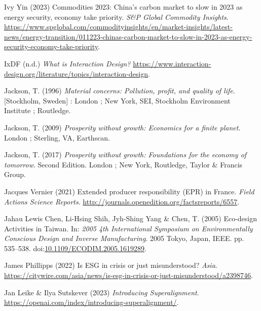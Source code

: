 \documentclass[
  letterpaper,
  DIV=11,
  numbers=noendperiod]{scrartcl}
\newlength{\cslhangindent}
\newenvironment{CSLReferences}[2] %
 {\begin{list}{}{%
  \setlength{\itemindent}{0pt}
  \setlength{\leftmargin}{0pt}
  \setlength{\parsep}{0pt}
  \ifodd #1
   \setlength{\leftmargin}{\cslhangindent}
   \setlength{\itemindent}{-1\cslhangindent}
  \fi
  \setlength{\itemsep}{#2\baselineskip}}}
 {\end{list}}
\begin{document}
\begin{CSLReferences}{0}{1}
Ivy Yin (2023) Commodities 2023: {China}'s carbon market to slow in 2023
as energy security, economy take priority. \emph{S\&P Global Commodity
Insights}.
\url{https://www.spglobal.com/commodityinsights/en/market-insights/latest-news/energy-transition/011223-chinas-carbon-market-to-slow-in-2023-as-energy-security-economy-take-priority}.

IxDF (n.d.) \emph{What is {Interaction Design}?}
\url{https://www.interaction-design.org/literature/topics/interaction-design}.

Jackson, T. (1996) \emph{Material concerns: Pollution, profit, and
quality of life}. {[}Stockholm, Sweden{]} : London ; New York, SEI,
Stockholm Environment Institute ; Routledge.

Jackson, T. (2009) \emph{Prosperity without growth: Economics for a
finite planet}. London ; Sterling, VA, Earthscan.

Jackson, T. (2017) \emph{Prosperity without growth: Foundations for the
economy of tomorrow}. Second Edition. London ; New York, Routledge,
Taylor \& Francis Group.

Jacques Vernier (2021) Extended producer responsibility ({EPR}) in
{France}. \emph{Field Actions Science Reports}.
\url{http://journals.openedition.org/factsreports/6557}.

Jahau Lewis Chen, Li-Hsing Shih, Jyh-Shing Yang \& Chen, T. (2005)
Eco-design {Activities} in {Taiwan}. In: \emph{2005 4th {International
Symposium} on {Environmentally Conscious Design} and {Inverse
Manufacturing}}. 2005 Tokyo, Japan, IEEE. pp. 535--538.
doi:\href{https://doi.org/10.1109/ECODIM.2005.1619289}{10.1109/ECODIM.2005.1619289}.

James Phillipps (2022) Is {ESG} in crisis or just misunderstood?
\emph{Asia}.
\url{https://citywire.com/asia/news/is-esg-in-crisis-or-just-misunderstood/a2398746}.

Jan Leike \& Ilya Sutskever (2023) \emph{Introducing {Superalignment}}.
\url{https://openai.com/index/introducing-superalignment/}.


\end{CSLReferences}
\end{document}
